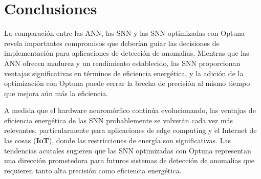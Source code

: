\section{Conclusiones}

La comparación entre las ANN, las SNN y las SNN optimizadas con Optuna revela importantes compromisos que deberían guiar las decisiones de implementación para aplicaciones de detección de anomalías. Mientras que las ANN ofrecen madurez y un rendimiento establecido, las SNN proporcionan ventajas significativas en términos de eficiencia energética, y la adición de la optimización con Optuna puede cerrar la brecha de precisión al mismo tiempo que mejora aún más la eficiencia.

A medida que el hardware neuromórfico continúa evolucionando, las ventajas de eficiencia energética de las SNN probablemente se volverán cada vez más relevantes, particularmente para aplicaciones de edge computing y el Internet de las cosas (\textbf{IoT}), donde las restricciones de energía son significativas. Las tendencias acutales sugieren que las SNN optimizadas con Optuna representan una dirección prometedora para futuros sistemas de detección de anomalías que requieren tanto alta precisión como eficiencia energética.
